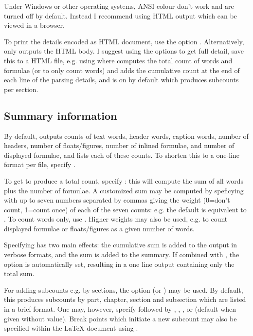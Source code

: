 \documentclass{article}
\begin{document}
Under Windows or other operating systems, ANSI colour don't work and are turned off by default. Instead I recommend using HTML output which can be viewed in a browser.

To print the details encoded as HTML document, use the option . Alternatively,  only outputs the HTML body. I suggest using the options  to get full detail, save this to a HTML file, e.g. using
where  computes the total count of words and formulae (or  to only count words) and adds the cumulative count at the end of each line of the parsing details, and  is on by default which produces subcounts per section.

\subsection{Summary information}

By default, \TeXcount{} outputs counts of text words, header words, caption words, number of headers, number of floats/figures, number of inlined formulae, and number of displayed formulae, and lists each of these counts. To shorten this to a one-line format per file, specify .

To get \TeXcount{} to produce a total count, specify : this will compute the sum of all words plus the number of formulae. A customized sum may be computed by speficying  with up to seven numbers separated by commas giving the weight (0=don't count, 1=count once) of each of the seven counts: e.g. the default is equivalent to . To count words only, use . Higher weights may also be used, e.g. to count displayed formulae or floats/figures as a given number of words.

Specifying  has two main effects: the cumulative sum is added to the output in verbose formats, and the sum is added to the summary. If combined with , the option  is automatically set, resulting in a one line output containing only the total sum.

For adding subcounts e.g. by sections, the option  (or ) may be used. By default, this produces subcounts by part, chapter, section and subsection which are listed in a brief format. One may, however, specify  followed by , , , or  (default when given without value). Break points which initiate a new subcount may also be specified within the \LaTeX{} document using .
\end{document}
